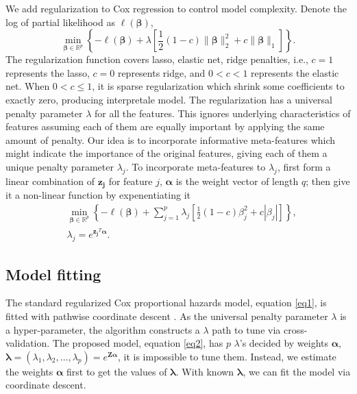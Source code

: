 We add regularization to Cox regression to control model complexity. Denote the log of partial likelihood as $\ell(\bm{\beta})$,
\begin{equation} \label{eq1}
    \min_{\bm{\beta}\in \mathbb{R}^p} \left\{-\ell(\bm{\beta}) + \lambda\left[\frac{1}{2}(1-c)\|\bm{\beta}\|_2^2 + c\|\bm{\beta}\|_1\right]\right\}.
\end{equation}
The regularization function covers lasso, elastic net, ridge penalties, i.e., $c=1$ represents the lasso, $c=0$ represents ridge, and $0<c<1$ represents the elastic net. When $0<c\leq1$, it is sparse regularization which shrink some coefficients to exactly zero, producing interpretale model. The regularization has a universal penalty parameter $\lambda$ for all the features. This ignores underlying characteristics of features assuming each of them are equally important by applying the same amount of penalty. Our idea is to incorporate informative meta-features which might indicate the importance of the original features, giving each of them a unique penalty parameter $\lambda_j$. To incorporate meta-features to $\lambda_j$, first form a linear combination of $\bm{z_j}$ for feature $j$, $\bm{\alpha}$ is the weight vector of length $q$; then give it a non-linear function by expenentiating it
\begin{equation} \label{eq2}
\begin{aligned}
    &\min_{\bm{\beta}\in \mathbb{R}^p} \left\{-\ell(\bm{\beta}) + \sum_{j=1}^p \lambda_j\left[\frac{1}{2}(1-c)\beta_j^2 + c|\beta_j|\right]\right\}, \\
    &\lambda_j = e^{\bm{z_j}^T \bm{\alpha}}.
\end{aligned}
\end{equation}

\subsection{Model fitting}
The standard regularized Cox proportional hazards model, equation \eqref{eq1}, is fitted with pathwise coordinate descent \citep{simon2011regularization}. As the universal penalty parameter $\lambda$ is a hyper-parameter, the algorithm constructs a $\lambda$ path to tune via cross-validation. The proposed model, equation \eqref{eq2}, has $p$ $\lambda$'s decided by weights $\bm{\alpha}$, $\bm{\lambda} = (\lambda_1,\lambda_2,\dots,\lambda_p) = e^{\bm{Z\alpha}}$, it is impossible to tune them. Instead, we estimate the weights $\bm{\alpha}$ first to get the values of $\bm{\lambda}$. With known $\bm{\lambda}$, we can fit the model via coordinate descent.

